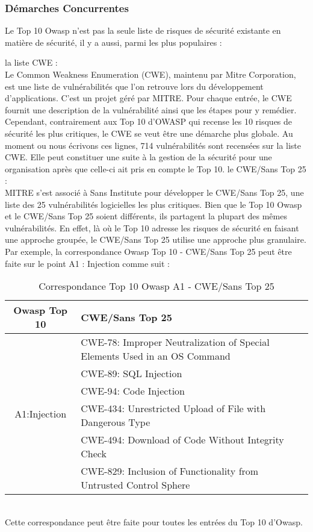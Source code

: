 \subsubsection{Démarches Concurrentes}
Le Top 10 Owasp n’est pas la seule liste de risques de sécurité existante en matière de sécurité, il y a aussi, parmi les plus populaires : 
\begin{itemize}
	\itemcheck la liste CWE : \\
	Le Common Weakness Enumeration (CWE), maintenu par Mitre Corporation, est une liste de vulnérabilités que l’on retrouve lors du développement d’applications. C'est un projet  géré par MITRE. Pour chaque entrée, le CWE fournit une description de la vulnérabilité ainsi que les étapes pour y remédier.\\
	Cependant, contrairement aux Top 10 d’OWASP qui recense les 10 risques de sécurité les plus critiques, le CWE se veut être une démarche plus globale. Au moment ou nous écrivons ces lignes, 714 vulnérabilités sont recensées sur la liste CWE. Elle peut constituer une suite à la gestion de la sécurité pour une organisation après que celle-ci ait pris en compte le Top 10.
	\itemcheck le CWE/Sans Top 25 : \\
	MITRE s'est associé à Sans Institute pour développer le CWE/Sans Top 25, une liste des 25 vulnérabilités logicielles les plus critiques. Bien que le Top 10 Owasp et le CWE/Sans Top 25 soient différents, ils partagent la plupart des mêmes vulnérabilités. En effet, là où le Top 10 adresse les risques de sécurité en faisant une approche groupée, le CWE/Sans Top 25 utilise une approche plus granulaire. Par exemple, la correspondance Owasp Top 10 - CWE/Sans Top 25 peut être faite sur le point A1 : Injection comme suit \cite{cross}:
	\begin{table}[hbt!]
		\centering
		\begin{tabular}{| c | l |} 
			\hline
			Owasp Top 10 & CWE/Sans Top 25 \\
			\hline
			\multirow{6}{4em}{A1:Injection} & CWE-78: Improper Neutralization of Special Elements Used in an OS Command \\ 
			& CWE-89: SQL Injection\\ 
			& CWE-94: Code Injection\\ 
			& CWE-434: Unrestricted Upload of File with Dangerous Type\\
			& CWE-494: Download of Code Without Integrity Check\\
			& CWE-829: Inclusion of Functionality from Untrusted Control Sphere\\
			\hline
		\end{tabular}
		\caption{Correspondance Top 10 Owasp A1 - CWE/Sans Top 25}
	\end{table}\\
	Cette correspondance peut être faite pour toutes les entrées du Top 10 d’Owasp.
\end{itemize}
